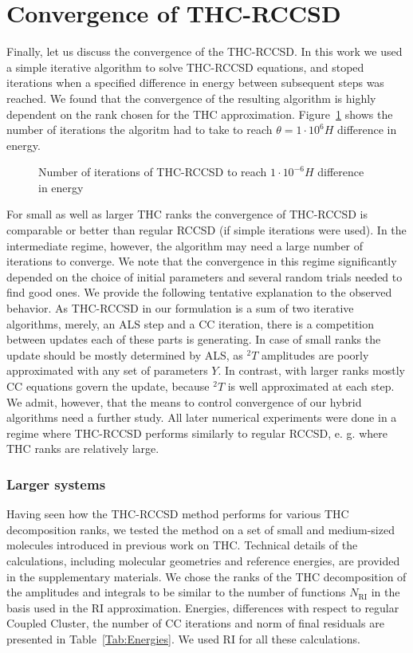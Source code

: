 \section{Convergence of THC-RCCSD}
Finally, let us discuss the convergence of the THC-RCCSD. In this 
work we used a simple iterative algorithm to solve THC-RCCSD equations, and 
stoped iterations when a specified difference in energy between subsequent 
steps was reached. We found that the convergence of the resulting algorithm is 
highly dependent on the rank chosen for the THC approximation. 
Figure~\ref{fig:cc_thc_convergence} shows the 
number of iterations the algoritm had to take to reach $\theta = 1\cdot 10^{6} 
H$ difference in energy.
%
\begin{figure}[tb]
\caption{Number of iterations of THC-RCCSD to reach $1 \cdot 10^{-6} H$ 
difference in energy}
\label{fig:cc_thc_convergence}
\end{figure}
%
For small as well as larger THC ranks the convergence of THC-RCCSD is 
comparable 
or better than regular RCCSD (if simple iterations were used). In the 
intermediate regime, however, the algorithm may need
a large number of iterations to converge. We note that the convergence in this 
regime significantly depended on the choice of initial parameters and several 
random trials needed to find good ones. 
We provide the following tentative explanation to the observed behavior. As 
THC-RCCSD in our formulation
is a sum of two iterative algorithms, merely, an ALS step and a CC iteration, 
there is a competition between 
updates each of these parts is generating. In case of small ranks the update 
should be mostly determined by ALS, as ${}^{2}T$ amplitudes are poorly 
approximated with any set of parameters $Y$. In 
contrast, with larger ranks mostly CC equations govern the update, because 
${}^2T$ is well approximated
 at each step. We admit, however, that the means to control convergence of our 
hybrid algorithms 
need a further study. All later numerical experiments were done in a regime 
where THC-RCCSD performs
similarly to regular RCCSD, e. g. where THC ranks are relatively large. 


\subsubsection{{Larger systems}
\label{sec:larger_systems}}

Having seen how the THC-RCCSD method performs for various THC
decomposition ranks, we tested the method on a set of small and
medium-sized molecules introduced in previous work on
THC.\cite{hohenstein_thc3} Technical details of the calculations,
including molecular geometries and reference energies, are provided in
the supplementary materials.  We chose the ranks of the THC
decomposition of the amplitudes and integrals to be similar to the
number of functions $N_\mathrm{RI}$ in the basis used in the RI
approximation. {\color{blue} Energies, differences with respect to regular 
Coupled Cluster,
the number of CC iterations and norm of final residuals are presented in 
Table~\ref{Tab:Energies}}.  We
used RI for all these calculations.
%

